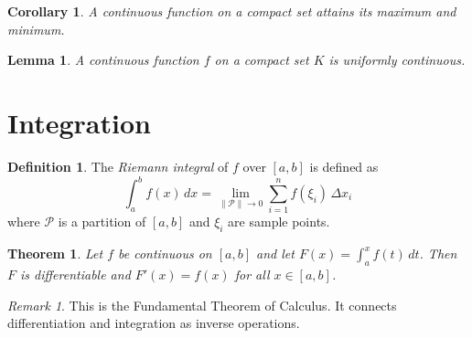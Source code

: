 \documentclass{article}
\newtheorem{theorem}{Theorem}
\newtheorem{lemma}{Lemma}
\newtheorem{corollary}{Corollary}
\theoremstyle{definition}
\newtheorem{definition}{Definition}
\theoremstyle{remark}
\newtheorem{remark}{Remark}
\begin{document}
\begin{corollary}\label{cor:compact-continuous}
A continuous function on a compact set attains its maximum and minimum.
\end{corollary}

\begin{lemma}\label{lem:uniform-on-compact}
A continuous function $f$ on a compact set $K$ is uniformly continuous.
\end{lemma}

\section{Integration}

\begin{definition}\label{def:riemann-integral}
The \emph{Riemann integral} of $f$ over $[a, b]$ is defined as
\[
    \int_a^b f(x)\, dx = \lim_{\|\mathcal{P}\| \to 0} \sum_{i=1}^{n} f(\xi_i)\,\Delta x_i
\]
where $\mathcal{P}$ is a partition of $[a, b]$ and $\xi_i$ are sample points.
\end{definition}

\begin{theorem}\label{thm:ftc}
Let $f$ be continuous on $[a, b]$ and let $F(x) = \int_a^x f(t)\, dt$.
Then $F$ is differentiable and $F'(x) = f(x)$ for all $x \in [a, b]$.
\end{theorem}

\begin{remark}
This is the Fundamental Theorem of Calculus. It connects differentiation
and integration as inverse operations.
\end{remark}
\end{document}
